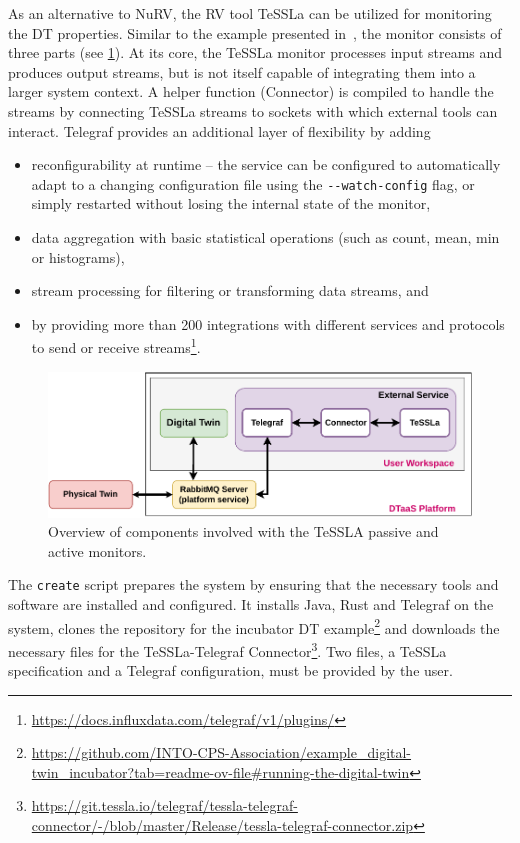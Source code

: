 As an alternative to NuRV, the RV tool TeSSLa can be utilized for monitoring the DT properties.
Similar to the example presented in~\cite{TT-Connector}, the monitor consists of three parts (see \cref{fig:architecture-diagram}).
At its core, the TeSSLa monitor processes input streams and produces output streams, but is not itself capable of integrating them into a larger system context.
A helper function (Connector) is compiled to handle the streams by connecting TeSSLa streams to sockets with which external tools can interact.
Telegraf provides an additional layer of flexibility by adding
\begin{itemize}
	\item reconfigurability at runtime -- the service can be configured to automatically adapt to a changing configuration file using the \lstinline{--watch-config} flag, or simply restarted without losing the internal state of the monitor,
	\item data aggregation with basic statistical operations (such as count, mean, min or histograms),
	\item stream processing for filtering or transforming data streams, and
	\item by providing more than 200 integrations with different services and protocols to send or receive streams\footnote{\url{https://docs.influxdata.com/telegraf/v1/plugins/}}.
\end{itemize}%
%
\begin{figure}[tbp]
	\centering
	\includegraphics[width=\columnwidth]{images/TeSSLa-integration.pdf}
	\caption{Overview of components involved with the TeSSLA passive and active monitors.}
	\label{fig:architecture-diagram}
\end{figure}%
%
The \texttt{create} script prepares the system by ensuring that the necessary tools and software are installed and configured.
It installs Java, Rust and Telegraf on the system, clones the repository for the incubator DT example\footnote{\url{https://github.com/INTO-CPS-Association/example_digital-twin_incubator?tab=readme-ov-file\#running-the-digital-twin}} and downloads the necessary files for the TeSSLa-Telegraf Connector\footnote{\url{https://git.tessla.io/telegraf/tessla-telegraf-connector/-/blob/master/Release/tessla-telegraf-connector.zip}}. Two files, a TeSSLa specification and a Telegraf configuration, must be provided by the user.


